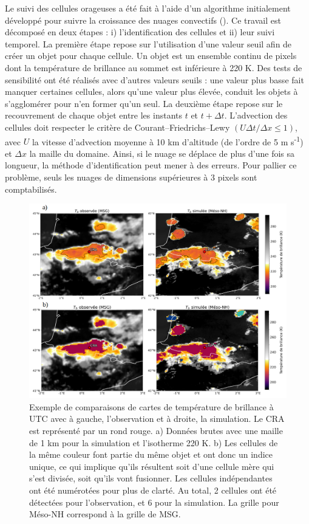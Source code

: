 \documentclass[12pt]{article}
\begin{document}
\begin{multicols}{2}
Le suivi des cellules orageuses a été fait à l'aide d'un algorithme initialement développé pour suivre la croissance des nuages convectifs (\cite{maury}). Ce travail est décomposé en deux étapes : i) l'identification des cellules et ii) leur suivi temporel. La première étape repose sur l'utilisation d'une valeur seuil afin de créer un objet pour chaque cellule. Un objet est un ensemble continu de pixels dont la température de brillance au sommet est inférieure à 220 K. Des tests de sensibilité ont été réalisés avec d'autres valeurs seuils : une valeur plus basse fait  manquer certaines cellules, alors qu'une valeur plus élevée, conduit les objets à s'agglomérer pour n'en former qu'un seul. La deuxième étape repose sur le recouvrement de chaque objet entre les instants $t$ et $t + \Delta t$. L'advection des cellules doit respecter le critère de Courant–Friedrichs–Lewy $(U \Delta t / \Delta x \leqslant 1)$, avec $U$ la vitesse d'advection moyenne à 10 km d'altitude (de l'ordre de 5 m s\textsuperscript{-1}) et $\Delta x$ la maille du domaine. Ainsi, si le nuage se déplace de plus d'une fois sa longueur, la méthode d'identification peut mener à des erreurs. Pour pallier ce problème, seuls les nuages de dimensions supérieures à 3 pixels sont comptabilisés.

\end{multicols}
\vspace{-0.3cm}
\begin{figure}[H]
    \centering
    \includegraphics[width=0.8\linewidth]{Figures/Cartes.png}
    \caption{Exemple de comparaisons de cartes de température de brillance à \protect{} UTC avec à gauche, l'observation et à droite, la simulation. Le CRA est représenté par un rond rouge. a) Données brutes avec une maille de 1 km pour la simulation et l'isotherme 220 K. b) Les cellules de la même couleur font partie du même objet et ont donc un indice unique, ce qui implique qu'ils résultent soit d'une cellule mère qui s'est divisée, soit qu'ils vont fusionner. Les cellules indépendantes ont été numérotées pour plus de clarté. Au total, 2 cellules ont été détectées pour l'observation, et 6 pour la simulation. La grille pour Méso-NH correspond à la grille de MSG.}
    \label{fig:fig2}
\end{figure}
\end{document}
